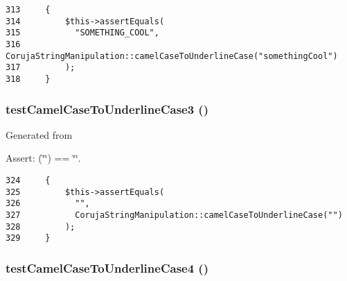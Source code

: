 \begin{Code}\begin{verbatim}313     {
314         $this->assertEquals(
315           "SOMETHING_COOL",
316           CorujaStringManipulation::camelCaseToUnderlineCase("somethingCool")
317         );
318     }
\end{verbatim}
\end{Code}


\hypertarget{class_coruja_string_manipulation_test_28582182f36bf5c3b16b4abae513f484}{
\subsubsection[{testCamelCaseToUnderlineCase3}]{\setlength{\rightskip}{0pt plus 5cm}testCamelCaseToUnderlineCase3 ()}}
\label{class_coruja_string_manipulation_test_28582182f36bf5c3b16b4abae513f484}


Generated from \begin{Desc}
\item[Assert:](\char`\"{}\char`\"{}) == \char`\"{}\char`\"{}. \end{Desc}


\begin{Code}\begin{verbatim}324     {
325         $this->assertEquals(
326           "",
327           CorujaStringManipulation::camelCaseToUnderlineCase("")
328         );
329     }
\end{verbatim}
\end{Code}


\hypertarget{class_coruja_string_manipulation_test_831b1d10e8ebec07238c2149417df3b5}{
\subsubsection[{testCamelCaseToUnderlineCase4}]{\setlength{\rightskip}{0pt plus 5cm}testCamelCaseToUnderlineCase4 ()}}
\label{class_coruja_string_manipulation_test_831b1d10e8ebec07238c2149417df3b5}


